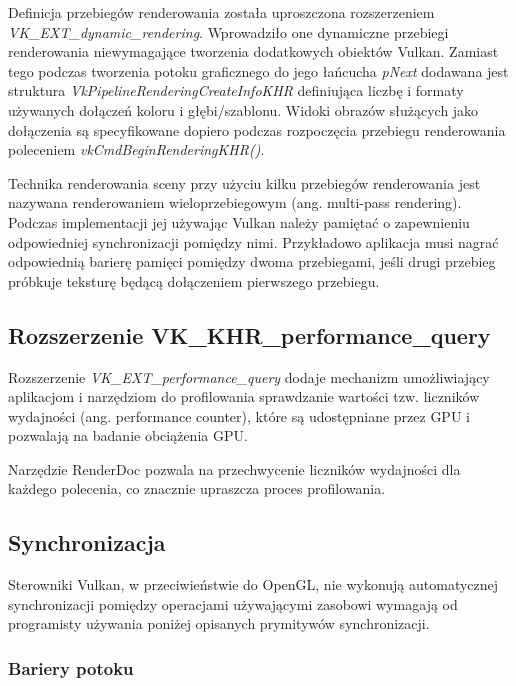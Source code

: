 Definicja przebiegów renderowania została uproszczona rozszerzeniem \textit{VK\_EXT\_dynamic\_rendering}. Wprowadziło one dynamiczne przebiegi renderowania niewymagające tworzenia dodatkowych obiektów Vulkan.
Zamiast tego podczas tworzenia potoku graficznego do jego łańcucha \textit{pNext} dodawana jest struktura \textit{VkPipelineRenderingCreateInfoKHR} definiująca liczbę i formaty używanych dołączeń koloru i głębi/szablonu.
Widoki obrazów służących jako dołączenia są specyfikowane dopiero podczas rozpoczęcia przebiegu renderowania poleceniem \textit{vkCmdBeginRenderingKHR()}.

Technika renderowania sceny przy użyciu kilku przebiegów renderowania jest nazywana renderowaniem wieloprzebiegowym (ang. multi-pass rendering).
Podczas implementacji jej używając Vulkan należy pamiętać o zapewnieniu odpowiedniej synchronizacji pomiędzy nimi.
Przykładowo aplikacja musi nagrać odpowiednią barierę pamięci pomiędzy dwoma przebiegami, jeśli drugi przebieg próbkuje teksturę będącą dołączeniem pierwszego przebiegu.


\subsection{Rozszerzenie VK\_KHR\_performance\_query}

Rozszerzenie \textit{VK\_EXT\_performance\_query} dodaje mechanizm umożliwiający aplikacjom i narzędziom do profilowania sprawdzanie wartości tzw. liczników wydajności (ang. performance counter), które są udostępniane przez GPU i pozwalają na badanie obciążenia GPU.

Narzędzie RenderDoc \cite{RENDERDOC} pozwala na przechwycenie liczników wydajności dla każdego polecenia, co znacznie upraszcza proces profilowania.




\subsection{Synchronizacja}

Sterowniki Vulkan, w przeciwieństwie do OpenGL, nie wykonują automatycznej synchronizacji pomiędzy operacjami używającymi zasobowi wymagają od programisty używania poniżej opisanych prymitywów synchronizacji.

\subsubsection{Bariery potoku}

